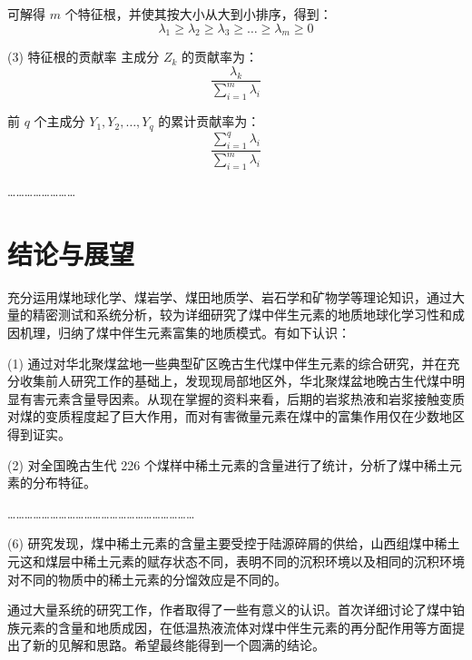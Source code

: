 可解得 $m$ 个特征根，并使其按大小从大到小排序，得到：
\begin{equation}
    \lambda_1 \ge \lambda_2 \ge \lambda_3 \ge \dots \ge \lambda_m \ge 0
\end{equation}

(3) 特征根的贡献率
主成分 $Z_k$ 的贡献率为：
\begin{equation}
    \frac{\lambda_k}{\sum_{i=1}^m \lambda_i}
\end{equation}

前 $q$ 个主成分 $Y_1, Y_2, \dots, Y_q$ 的累计贡献率为：
\begin{equation}
    \frac{\sum_{i=1}^q \lambda_i}{\sum_{i=1}^m \lambda_i}
\end{equation}

\dots\dots\dots\dots\dots\dots\dots\dots

\section{结论与展望}

充分运用煤地球化学、煤岩学、煤田地质学、岩石学和矿物学等理论知识，通过大量的精密测试和系统分析，较为详细研究了煤中伴生元素的地质地球化学习性和成因机理，归纳了煤中伴生元素富集的地质模式。有如下认识：

(1) 通过对华北聚煤盆地一些典型矿区晚古生代煤中伴生元素的综合研究，并在充分收集前人研究工作的基础上，发现现局部地区外，华北聚煤盆地晚古生代煤中明显有害元素含量导因素。从现在掌握的资料来看，后期的岩浆热液和岩浆接触变质对煤的变质程度起了巨大作用，而对有害微量元素在煤中的富集作用仅在少数地区得到证实。

(2) 对全国晚古生代 226 个煤样中稀土元素的含量进行了统计，分析了煤中稀土元素的分布特征。

\dots\dots\dots\dots\dots\dots\dots\dots\dots\dots\dots\dots\dots\dots\dots\dots\dots\dots\dots\dots\dots\dots

(6) 研究发现，煤中稀土元素的含量主要受控于陆源碎屑的供给，山西组煤中稀土元这和煤层中稀土元素的赋存状态不同，表明不同的沉积环境以及相同的沉积环境对不同的物质中的稀土元素的分馏效应是不同的。

通过大量系统的研究工作，作者取得了一些有意义的认识。首次详细讨论了煤中铂族元素的含量和地质成因，在低温热液流体对煤中伴生元素的再分配作用等方面提出了新的见解和思路。希望最终能得到一个圆满的结论。

\clearpage
\mbox{}
\clearpage 
